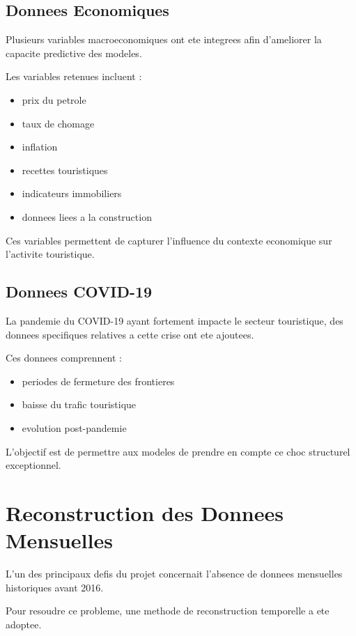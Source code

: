 \documentclass[12pt,a4paper]{report}
\begin{document}
\subsection{Donnees Economiques}

Plusieurs variables macroeconomiques ont ete integrees afin d'ameliorer
la capacite predictive des modeles.

Les variables retenues incluent :

\begin{itemize}
    \item prix du petrole
    \item taux de chomage
    \item inflation
    \item recettes touristiques
    \item indicateurs immobiliers
    \item donnees liees a la construction
\end{itemize}

Ces variables permettent de capturer l'influence du contexte economique
sur l'activite touristique.

\subsection{Donnees COVID-19}

La pandemie du COVID-19 ayant fortement impacte le secteur touristique,
des donnees specifiques relatives a cette crise ont ete ajoutees.

Ces donnees comprennent :

\begin{itemize}
    \item periodes de fermeture des frontieres
    \item baisse du trafic touristique
    \item evolution post-pandemie
\end{itemize}

L'objectif est de permettre aux modeles de prendre en compte ce choc
structurel exceptionnel.

\section{Reconstruction des Donnees Mensuelles}

L'un des principaux defis du projet concernait l'absence de donnees
mensuelles historiques avant 2016.

Pour resoudre ce probleme, une methode de reconstruction temporelle
a ete adoptee.
\end{document}
